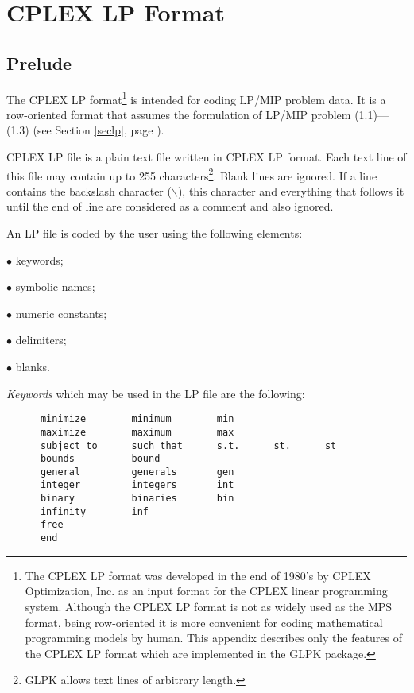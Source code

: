 
\chapter{CPLEX LP Format}
\label{chacplex}

\section{Prelude}

The CPLEX LP format\footnote{The CPLEX LP format was developed in
the end of 1980's by CPLEX Optimization, Inc. as an input format for
the CPLEX linear programming system. Although the CPLEX LP format is
not as widely used as the MPS format, being row-oriented it is more
convenient for coding mathematical programming models by human. This
appendix describes only the features of the CPLEX LP format which are
implemented in the GLPK package.} is intended for coding LP/MIP problem
data. It is a row-oriented format that assumes the formulation of LP/MIP
problem (1.1)---(1.3) (see Section \ref{seclp}, page \pageref{seclp}).

CPLEX LP file is a plain text file written in CPLEX LP format. Each text
line of this file may contain up to 255 characters\footnote{GLPK allows
text lines of arbitrary length.}. Blank lines are ignored. If a line
contains the backslash character ($\backslash$), this character and
everything that follows it until the end of line are considered as a
comment and also ignored.

An LP file is coded by the user using the following elements:

$\bullet$ keywords;

$\bullet$ symbolic names;

$\bullet$ numeric constants;

$\bullet$ delimiters;

$\bullet$ blanks.

\newpage

{\it Keywords} which may be used in the LP file are the following:

\begin{verbatim}
      minimize        minimum        min
      maximize        maximum        max
      subject to      such that      s.t.      st.      st
      bounds          bound
      general         generals       gen
      integer         integers       int
      binary          binaries       bin
      infinity        inf
      free
      end
\end{verbatim}

